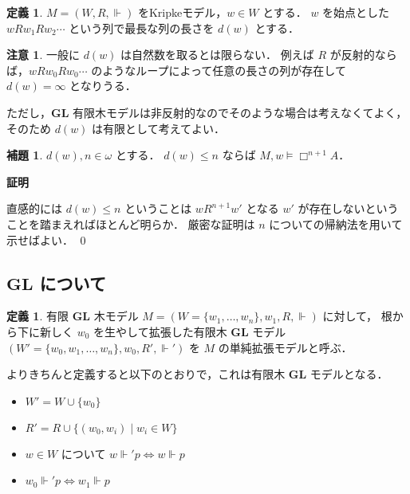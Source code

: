 \documentclass{jsarticle}
\makeatletter
\newcommand*{\Logic}[1]{\mathbf{#1}}
\newcommand*{\LogicGL}{\Logic{GL}}
\theoremstyle{definition}
\newtheorem{lemma}[theorem]{補題}
\newtheorem{definition}[theorem]{定義}
\newtheorem{remark}[theorem]{注意}
\renewcommand{\proofname}{証明}
\renewenvironment{proof}[1][\proofname]{\par
    \normalfont 
    \topsep6\p@\@plus6\p@\relax
    \trivlist
    \item\relax
    {\bfseries\gtfamily
    #1\@addpunct{.}}\hspace\labelsep\ignorespaces
    }{%
    \endtrivlist
    \@endpefalse
}
\makeatother
\begin{document}
\begin{definition}
    $M = (W, R, \Vdash)$ をKripkeモデル，$w \in W$ とする．
    $w$ を始点とした $w R w_1 R w_2 \cdots$ という列で最長な列の長さを $d(w)$ とする．
\end{definition}

\begin{remark}
    一般に $d(w)$ は自然数を取るとは限らない．
    例えば $R$ が反射的ならば，$w R w_0 R w_0 \cdots$ のようなループによって任意の長さの列が存在して $d(w) = \infty$ となりうる．

    ただし，$\LogicGL$ 有限木モデルは非反射的なのでそのような場合は考えなくてよく，そのため $d(w)$ は有限として考えてよい．
\end{remark}

\begin{lemma}\label{lem:cannot_access}
    $d(w), n \in \omega$ とする．
    $d(w) \leq n$ ならば $M,w \vDash \Box^{n + 1} A$．
\end{lemma}

\begin{proof}
    直感的には $d(w) \leq n$ ということは $w R^{n + 1} w'$ となる $w'$ が存在しないということを踏まえればほとんど明らか．
    厳密な証明は $n$ についての帰納法を用いて示せばよい．
    \qed
\end{proof}

\subsection{$\LogicGL$ について}

\begin{definition}
    有限 $\LogicGL$ 木モデル $M = (W = \{w_1,\dots,w_n\}, w_1, R, \Vdash)$ に対して，
    根から下に新しく $w_0$ を生やして拡張した有限木 $\LogicGL$ モデル $(W' = \{w_0,w_1,\dots,w_n\}, w_0, R', \Vdash')$ を $M$ の単純拡張モデルと呼ぶ．

    よりきちんと定義すると以下のとおりで，これは有限木 $\LogicGL$ モデルとなる．
    \begin{itemize}
        \item $W' = W \cup \{w_0\}$
        \item $R' = R \cup \{(w_0,w_i) \mid w_i \in W\}$
        \item $w \in W$ について $w \Vdash' p \iff w \Vdash p$
        \item $w_0 \Vdash' p \iff w_1 \Vdash p$
    \end{itemize}
\end{definition}
\end{document}
